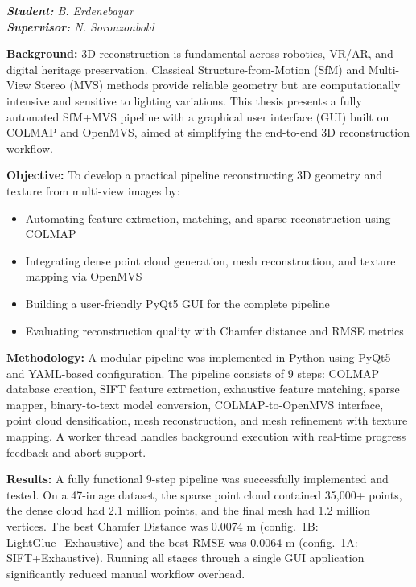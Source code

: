 \begin{flushright}
\itshape
\textbf{Student:} B. Erdenebayar\\
\textbf{Supervisor:} N. Soronzonbold
\end{flushright}

\vspace{0.5cm}

\noindent\textbf{Background:}
3D reconstruction is fundamental across robotics, VR/AR, and digital heritage preservation. Classical Structure-from-Motion (SfM) and Multi-View Stereo (MVS) methods provide reliable geometry but are computationally intensive and sensitive to lighting variations. This thesis presents a fully automated SfM+MVS pipeline with a graphical user interface (GUI) built on COLMAP and OpenMVS, aimed at simplifying the end-to-end 3D reconstruction workflow.

\vspace{0.3cm}

\noindent\textbf{Objective:}
To develop a practical pipeline reconstructing 3D geometry and texture from multi-view images by:
\begin{itemize}
\item Automating feature extraction, matching, and sparse reconstruction using COLMAP
\item Integrating dense point cloud generation, mesh reconstruction, and texture mapping via OpenMVS
\item Building a user-friendly PyQt5 GUI for the complete pipeline
\item Evaluating reconstruction quality with Chamfer distance and RMSE metrics
\end{itemize}

\vspace{0.3cm}

\noindent\textbf{Methodology:}
A modular pipeline was implemented in Python using PyQt5 and YAML-based configuration. The pipeline consists of 9 steps: COLMAP database creation, SIFT feature extraction, exhaustive feature matching, sparse mapper, binary-to-text model conversion, COLMAP-to-OpenMVS interface, point cloud densification, mesh reconstruction, and mesh refinement with texture mapping. A worker thread handles background execution with real-time progress feedback and abort support.

\vspace{0.3cm}

\noindent\textbf{Results:}
A fully functional 9-step pipeline was successfully implemented and tested. On a 47-image dataset, the sparse point cloud contained 35,000+ points, the dense cloud had 2.1 million points, and the final mesh had 1.2 million vertices. The best Chamfer Distance was 0.0074 m (config.\ 1B: LightGlue+Exhaustive) and the best RMSE was 0.0064 m (config.\ 1A: SIFT+Exhaustive). Running all stages through a single GUI application significantly reduced manual workflow overhead.

